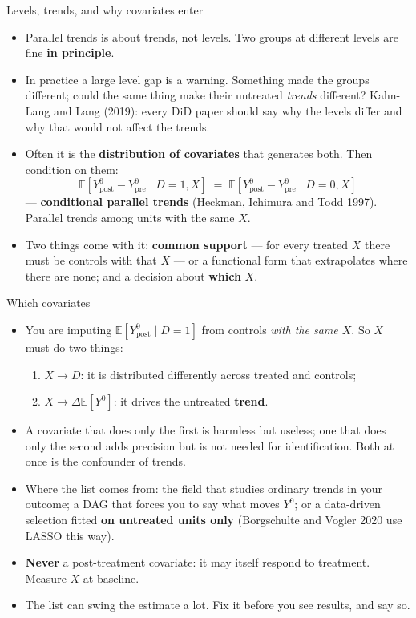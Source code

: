 \documentclass[
  11pt,
  ignorenonframetext,
  aspectratio=169,
]{beamer}
\newcounter{none} %
\providecommand{\tightlist}{%
  \setlength{\itemsep}{0pt}\setlength{\parskip}{0pt}}
\begin{document}
\begin{frame}{Levels, trends, and why covariates enter}
\protect{}\label{levels-trends-and-why-covariates-enter}
\begin{itemize}
\tightlist
\item
  Parallel trends is about trends, not levels. Two groups at different
  levels are fine \textbf{in principle}.
\item
  In practice a large level gap is a warning. Something made the groups
  different; could the same thing make their untreated \emph{trends}
  different? Kahn-Lang and Lang (2019): every DiD paper should say why
  the levels differ and why that would not affect the trends.
\item
  Often it is the \textbf{distribution of covariates} that generates
  both. Then condition on them: \[
  \mathbb{E}[Y^0_{\text{post}} - Y^0_{\text{pre}} \mid D=1, X] \;=\; \mathbb{E}[Y^0_{\text{post}} - Y^0_{\text{pre}} \mid D=0, X]
  \] --- \textbf{conditional parallel trends} (Heckman, Ichimura and
  Todd 1997). Parallel trends among units with the same \(X\).
\item
  Two things come with it: \textbf{common support} --- for every treated
  \(X\) there must be controls with that \(X\) --- or a functional form
  that extrapolates where there are none; and a decision about
  \textbf{which} \(X\).
\end{itemize}
\end{frame}

\begin{frame}{Which covariates}
\protect{}\label{which-covariates}
\begin{itemize}
\tightlist
\item
  You are imputing \(\mathbb{E}[Y^0_{\text{post}} \mid D=1]\) from
  controls \emph{with the same \(X\)}. So \(X\) must do two things:

  \begin{enumerate}
  \tightlist
  \item
    \(X \rightarrow D\): it is distributed differently across treated
    and controls;
  \item
    \(X \rightarrow \Delta \mathbb{E}[Y^0]\): it drives the untreated
    \textbf{trend}.
  \end{enumerate}
\item
  A covariate that does only the first is harmless but useless; one that
  does only the second adds precision but is not needed for
  identification. Both at once is the confounder of trends.
\item
  Where the list comes from: the field that studies ordinary trends in
  your outcome; a DAG that forces you to say what moves \(Y^0\); or a
  data-driven selection fitted \textbf{on untreated units only}
  (Borgschulte and Vogler 2020 use LASSO this way).
\item
  \textbf{Never} a post-treatment covariate: it may itself respond to
  treatment. Measure \(X\) at baseline.
\item
  The list can swing the estimate a lot. Fix it before you see results,
  and say so.
\end{itemize}
\end{frame}
\end{document}
